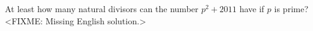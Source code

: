 \problem
At least how many natural divisors can the number $p^2+2011$ have if $p$ is
prime?
\solution
<FIXME: Missing English solution.>
\endproblem
